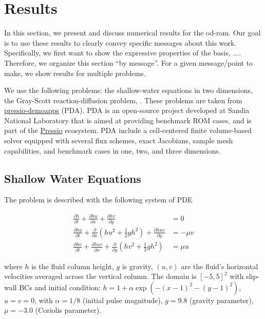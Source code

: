 

\section{Results} \label{sec:results}

In this section, we present and discuss numerical results for the od-rom.
Our goal is to use these results to clearly convey specific messages about this work.
Specifically, we first want to show the expressive properties of the basis, ....
Therefore, we organize this section ``by message''.
For a given message/point to make, we show results for multiple problems.

We use the following problems: the shallow-water equations in two dimensions, the Gray-Scott reaction-diffusion problem, .
These problems are taken from \href{https://pressio.github.io/pressio-demoapps}{\textsf{pressio-demoapps}} (PDA).
PDA is an open-source project developed at Sandia National Laboratory that is aimed at providing benchmark ROM cases, and is part of the \href{https://pressio.github.io/}{\textsf{Pressio}} ecosystem.
PDA include a cell-centered finite volume-based solver equipped with several flux schemes, exact Jacobians, sample mesh capabilities, and benchmark cases in one, two, and three dimensions.

\subsection{Shallow Water Equations}

The problem is described with the following system of PDE

\begin{align}
  \frac{\partial h}{\partial t} + \frac{\partial hu}{\partial x} + \frac{\partial hv}{\partial y} &= 0 \\
  \frac{\partial hu}{\partial t} + \frac{\partial }{\partial x} (hu^2 + \frac{1}{2}g h^2) + \frac{\partial huv}{\partial y} &= -\mu v \\
  \frac{\partial hv}{\partial t} + \frac{\partial huv}{\partial x} + \frac{\partial }{\partial y} (hv^2 + \frac{1}{2}g h^2) &= \mu u
\end{align}

where $h$ is the fluid column height, $g$ is gravity, $(u, v)$ are the fluid's horizontal velocities averaged across the vertical column.
The domain is $[-5, 5]^2$ with slip-wall BCs and initial condition: $h = 1 + \alpha \exp( -(x-1)^2 - (y-1)^2)$, $u = v = 0$,
with $\alpha = 1/8$ (initial pulse magnitude), $g = 9.8$ (gravity parameter), $\mu = -3.0$ (Coriolis parameter).



